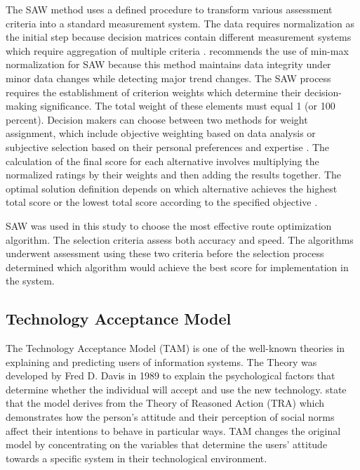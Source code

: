The SAW method uses a defined procedure to transform various assessment criteria into a standard measurement system. The data requires normalization as the initial step because decision matrices contain different measurement systems which require aggregation of multiple criteria \parencite{Hamed2023}. \textcite{Malefaki2025} recommends the use of min-max normalization for SAW because this method maintains data integrity under minor data changes while detecting major trend changes. The SAW process requires the establishment of criterion weights which determine their decision-making significance. The total weight of these elements must equal 1 (or 100 percent). Decision makers can choose between two methods for weight assignment, which include objective weighting based on data analysis or subjective selection based on their personal preferences and expertise \parencite{Odu2019}. The calculation of the final score for each alternative involves multiplying the normalized ratings by their weights and then adding the results together. The optimal solution definition depends on which alternative achieves the highest total score or the lowest total score according to the specified objective \parencite{Hamed2023}.

SAW was used in this study to choose the most effective route optimization algorithm. The selection criteria assess both accuracy and speed. The algorithms underwent assessment using these two criteria before the selection process determined which algorithm would achieve the best score for implementation in the system.

\subsection{Technology Acceptance Model}
The Technology Acceptance Model (TAM) is one of the well-known theories in explaining and predicting users of information systems. The Theory was developed by Fred D. Davis in 1989 to explain the psychological factors that determine whether the individual will accept and use the new technology. \textcite{Marikyan2025TAM} state that the model derives from the Theory of Reasoned Action (TRA) which demonstrates how the person’s attitude and their perception of social norms affect their intentions to behave in particular ways. TAM changes the original model by concentrating on the variables that determine the users’ attitude towards a specific system in their technological environment.


